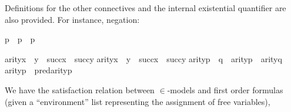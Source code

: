 Definitions for the other connectives and the internal existential
quantifier are also provided. For instance, negation:%
\begin{isabelle}%
{\isasymcdot}{\isasymnot}p{\isasymcdot}\ {\isasymequiv}\ {\isasymcdot}{\isasymnot}{\isacharparenleft}{\kern0pt}p\ {\isasymand}\ p{\isacharparenright}{\kern0pt}{\isasymcdot}%
\end{isabelle}%
\begin{isabelle}%
arity{\isacharparenleft}{\kern0pt}{\isasymcdot}x\ {\isasymin}\ y{\isasymcdot}{\isacharparenright}{\kern0pt}\ {\isacharequal}{\kern0pt}\ succ{\isacharparenleft}{\kern0pt}x{\isacharparenright}{\kern0pt}\ {\isasymunion}\ succ{\isacharparenleft}{\kern0pt}y{\isacharparenright}{\kern0pt}\isasep\isanewline%
arity{\isacharparenleft}{\kern0pt}{\isasymcdot}x\ {\isacharequal}{\kern0pt}\ y{\isasymcdot}{\isacharparenright}{\kern0pt}\ {\isacharequal}{\kern0pt}\ succ{\isacharparenleft}{\kern0pt}x{\isacharparenright}{\kern0pt}\ {\isasymunion}\ succ{\isacharparenleft}{\kern0pt}y{\isacharparenright}{\kern0pt}\isasep\isanewline%
arity{\isacharparenleft}{\kern0pt}{\isasymcdot}{\isasymnot}{\isacharparenleft}{\kern0pt}p\ {\isasymand}\ q{\isacharparenright}{\kern0pt}{\isasymcdot}{\isacharparenright}{\kern0pt}\ {\isacharequal}{\kern0pt}\ arity{\isacharparenleft}{\kern0pt}p{\isacharparenright}{\kern0pt}\ {\isasymunion}\ arity{\isacharparenleft}{\kern0pt}q{\isacharparenright}{\kern0pt}\isasep\isanewline%
arity{\isacharparenleft}{\kern0pt}{\isacharparenleft}{\kern0pt}{\isasymcdot}{\isasymforall}p{\isasymcdot}{\isacharparenright}{\kern0pt}{\isacharparenright}{\kern0pt}\ {\isacharequal}{\kern0pt}\ pred{\isacharparenleft}{\kern0pt}arity{\isacharparenleft}{\kern0pt}p{\isacharparenright}{\kern0pt}{\isacharparenright}{\kern0pt}%
\end{isabelle}%
We have the satisfaction relation between $\in$-models and
    first order formulas (given a “environment” list representing
    the assignment of free variables),%

